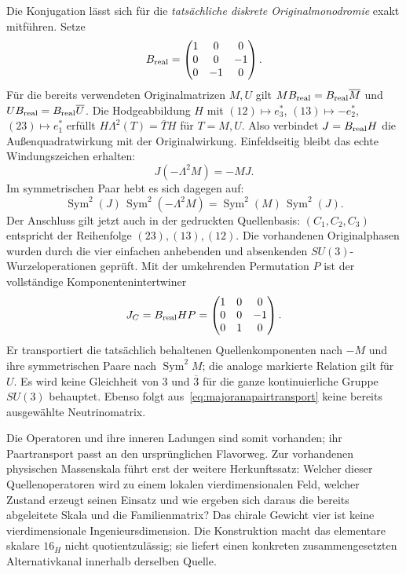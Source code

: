 Die Konjugation lässt sich für die \emph{tatsächliche diskrete Originalmonodromie} exakt mitführen. Setze
\begin{equation}
B_{\rm real}=\begin{pmatrix}1&0&0\\0&0&-1\\0&-1&0\end{pmatrix}.
\end{equation}
Für die bereits verwendeten Originalmatrizen $M,U$ gilt
$M B_{\rm real}=B_{\rm real}\overline M$ und
$U B_{\rm real}=B_{\rm real}\overline U$.
Die Hodgeabbildung $H$ mit
$(12)\mapsto e_3^*$, $(13)\mapsto-e_2^*$, $(23)\mapsto e_1^*$
erfüllt $H\Lambda^2(T)=\overline T H$ für $T=M,U$.
Also verbindet $J=B_{\rm real}H$ die Außenquadratwirkung mit der Originalwirkung. Einfeldseitig bleibt das echte Windungszeichen erhalten:
\begin{equation}
J(-\Lambda^2 M)=-M J.
\end{equation}
Im symmetrischen Paar hebt es sich dagegen auf:
\begin{equation}\label{eq:majoranapairtransport}
\boxed{\operatorname{Sym}^2(J)\,
\operatorname{Sym}^2(-\Lambda^2 M)
=\operatorname{Sym}^2(M)\,\operatorname{Sym}^2(J).}
\end{equation}
Der Anschluss gilt jetzt auch in der gedruckten Quellenbasis: $(C_1,C_2,C_3)$ entspricht der Reihenfolge $(23),(13),(12)$. Die vorhandenen Originalphasen wurden durch die vier einfachen anhebenden und absenkenden $SU(3)$-Wurzeloperationen geprüft. Mit der umkehrenden Permutation $P$ ist der vollständige Komponentenintertwiner
\begin{equation}
J_C=B_{\rm real}HP
=\begin{pmatrix}1&0&0\\0&0&-1\\0&1&0\end{pmatrix}.
\end{equation}
Er transportiert die tatsächlich behaltenen Quellenkomponenten nach $-M$ und ihre symmetrischen Paare nach $\operatorname{Sym}^2M$; die analoge markierte Relation gilt für $U$. Es wird keine Gleichheit von $3$ und $\overline3$ für die ganze kontinuierliche Gruppe $SU(3)$ behauptet. Ebenso folgt aus~\eqref{eq:majoranapairtransport} keine bereits ausgewählte Neutrinomatrix.

Die Operatoren und ihre inneren Ladungen sind somit vorhanden; ihr Paartransport passt an den ursprünglichen Flavorweg. Zur vorhandenen physischen Massenskala führt erst der weitere Herkunftssatz: Welcher dieser Quellenoperatoren wird zu einem lokalen vierdimensionalen Feld, welcher Zustand erzeugt seinen Einsatz und wie ergeben sich daraus die bereits abgeleitete Skala und die Familienmatrix? Das chirale Gewicht vier ist keine vierdimensionale Ingenieursdimension. Die Konstruktion macht das elementare skalare $16_H$ nicht quotientzulässig; sie liefert einen konkreten zusammengesetzten Alternativkanal innerhalb derselben Quelle.

